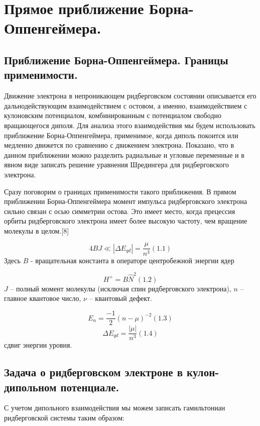 \section{Прямое
приближение
Борна-Оппенгеймера.}
\subsection{Приближение Борна-Оппенгеймера. Границы
применимости.}
Движение электрона в непроникающем ридберговском состоянии описывается его дальнодействующим взаимодействием с остовом, а именно, взаимодействием с кулоновским потенциалом, комбинированным с потенциалом свободно вращающегося диполя. Для анализа этого взаимодействия мы будем использовать приближение Борна-Оппенгеймера, применимое, когда диполь покоится или медленно движется по сравнению с движением электрона. Показано, что в данном приближении можно разделить радиальные и угловые переменные и в явном виде записать решение уравнения Шредингера для ридберговского электрона.

Сразу поговорим о границах применимости такого приближения. В прямом приближении Борна-Оппенгеймера момент импульса ридберговского электрона сильно связан с осью симметрии остова. Это имеет место, когда прецессия орбиты ридберговского электрона имеет более высокую частоту, чем вращение молекулы в целом.[8]

\begin{equation*}
4\mathit{BJ}{\ll}\left|{\Delta}E_{\mathit{qd}}\right|=\frac{\mu }{n^3}(1.1)
\end{equation*}
Здесь  $B$ -
вращательная константа в операторе центробежной энергии ядер

\begin{equation*}
	H^{+}=B\widehat  N^2(1.2)
\end{equation*}
$J$ -- полный момент молекулы (исключая спин ридберговского электрона),
$n$ -- главное квантовое число,
$\nu$ -- квантовый дефект.

\begin{equation*}
E_n=\frac{-1} 2\left(n-\mu \right)^{-2}(1.3)
\end{equation*}
\begin{equation*}
{\Delta}E_{\mathit{qd}}= \frac {|\mu|} {n^3}(1.4)
\end{equation*}
сдвиг энергии уровня.

\subsection{Задача о
ридберговском электроне в кулон-дипольном
потенциале.}
С учетом дипольного взаимодействия мы можем записать гамильтониан ридберговской системы таким образом:


